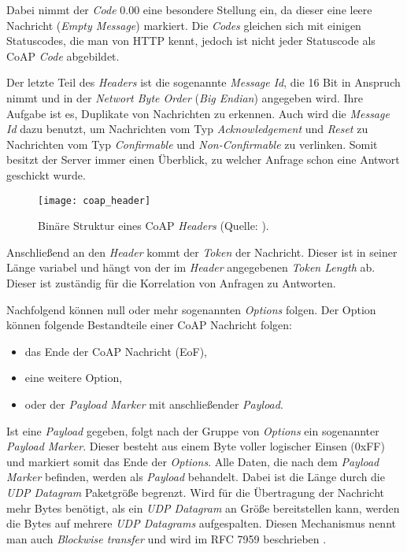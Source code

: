 Dabei nimmt der \textit{Code} 0.00 eine besondere Stellung ein, da dieser eine leere Nachricht (\textit{Empty Message}) markiert. Die \textit{Codes} gleichen sich mit einigen Statuscodes, die man von HTTP kennt, jedoch ist nicht jeder Statuscode als CoAP \textit{Code} abgebildet.

Der letzte Teil des \textit{Headers} ist die sogenannte \textit{Message Id}, die 16 Bit in Anspruch nimmt und in der \textit{Networt Byte Order} (\textit{Big Endian}) angegeben wird. Ihre Aufgabe ist es, Duplikate von Nachrichten zu erkennen. Auch wird die \textit{Message Id} dazu benutzt, um Nachrichten vom Typ \textit{Acknowledgement} und \textit{Reset} zu Nachrichten vom Typ \textit{Confirmable} und \textit{Non-Confirmable} zu verlinken. Somit besitzt der Server immer einen Überblick, zu welcher Anfrage schon eine Antwort geschickt wurde.

\begin{figure}[h]
    \centering
    \texttt{[image: coap\_header]}
    \caption{Binäre Struktur eines CoAP \textit{Headers} (Quelle: \autocite{RFC7252}).}
    \label{fig:binaere-sturktur-eines-coap-headers}
\end{figure}

Anschließend an den \textit{Header} kommt der \textit{Token} der Nachricht. Dieser ist in seiner Länge variabel und hängt von der im \textit{Header} angegebenen \textit{Token Length} ab. Dieser ist zuständig für die Korrelation von Anfragen zu Antworten.

Nachfolgend können null oder mehr sogenannten \textit{Options} folgen. Der Option können folgende Bestandteile einer CoAP Nachricht folgen:
\begin{itemize}
    \item das Ende der CoAP Nachricht (EoF),
    \item eine weitere Option,
    \item oder der \textit{Payload Marker} mit anschließender \textit{Payload}.
\end{itemize}

Ist eine \textit{Payload} gegeben, folgt nach der Gruppe von \textit{Options} ein sogenannter \textit{Payload Marker}. Dieser besteht aus einem Byte voller logischer Einsen (0xFF) und markiert somit das Ende der \textit{Options}. Alle Daten, die nach dem \textit{Payload Marker} befinden, werden als \textit{Payload} behandelt. Dabei ist die Länge durch die \textit{UDP Datagram} Paketgröße begrenzt. Wird für die Übertragung der Nachricht mehr Bytes benötigt, als ein \textit{UDP Datagram} an Größe bereitstellen kann, werden die Bytes auf mehrere \textit{UDP Datagrams} aufgespalten. Diesen Mechanismus nennt man auch \textit{Blockwise transfer} und wird im RFC 7959 beschrieben \autocite{RFC7959}.

